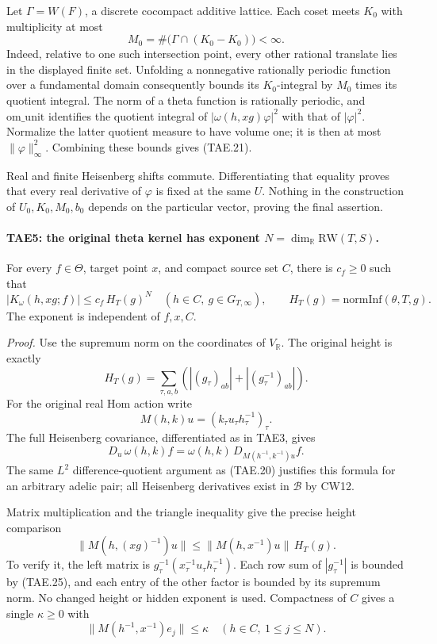 Let \(\Gamma=W(F)\), a discrete cocompact additive lattice.
Each coset meets \(K_0\) with multiplicity at most
\[
 M_0=\#\bigl(\Gamma\cap(K_0-K_0)\bigr)<\infty.
 \tag{TAE.23}
\]
Indeed, relative to one such intersection point, every other
rational translate lies in the displayed finite set.
Unfolding a nonnegative rationally periodic function over a
fundamental domain consequently bounds its \(K_0\)-integral
by \(M_0\) times its quotient integral.
The norm of a theta function is rationally periodic, and
\(\mathrm{om\_unit}\) identifies the quotient integral of
\(|\omega(h,xg)\varphi|^2\) with that of \(|\varphi|^2\).
Normalize the latter quotient measure to have volume one;
it is then at most \(\|\varphi\|_\infty^2\).
Combining these bounds gives (TAE.21).

Real and finite Heisenberg shifts commute.  Differentiating
that equality proves that every real derivative of
\(\varphi\) is fixed at the same \(U\).  Nothing in the
construction of \(U_0,K_0,M_0,b_0\) depends on the particular
vector, proving the final assertion.

\paragraph{TAE5: the original theta kernel has exponent \(N=\dim_{\mathbb R}\mathrm{RW}(T,S)\).}
\label{claim:TAE5}
For every \(f\in\Theta\), target point \(x\), and compact
source set \(C\), there is \(c_f\ge0\) such that
\[
 |K_\omega(h,xg;f)|
       \le c_f\,H_T(g)^N
       \quad(h\in C,\ g\in G_{T,\infty}),
 \qquad H_T(g)=\mathrm{normInf}(\theta,T,g).
 \tag{TAE.24}
\]
The exponent is independent of \(f,x,C\).

\emph{Proof.}
Use the supremum norm on the coordinates of \(V_{\mathbb R}\).
The original height is exactly
\[
 H_T(g)=\sum_{\tau,a,b}
       \left(|(g_\tau)_{ab}|+|(g_\tau^{-1})_{ab}|\right).
 \tag{TAE.25}
\]
For the original real Hom action write
\[
 M(h,k)u=(k_\tau u_\tau h_\tau^{-1})_\tau .
 \tag{TAE.26}
\]
The full Heisenberg covariance, differentiated as in TAE3,
gives
\[
 D_u\,\omega(h,k)f
        =\omega(h,k)\,D_{M(h^{-1},k^{-1})u}f .
 \tag{TAE.27}
\]
The same \(L^2\) difference-quotient argument as (TAE.20)
justifies this formula for an arbitrary adelic pair; all
Heisenberg derivatives exist in \(\mathcal B\) by CW12.

Matrix multiplication and the triangle inequality give the
precise height comparison
\[
 \|M(h,(xg)^{-1})u\|
       \le \|M(h,x^{-1})u\|\,H_T(g).
 \tag{TAE.28}
\]
To verify it, the left matrix is
\(g_\tau^{-1}(x_\tau^{-1}u_\tau h_\tau^{-1})\).
Each row sum of \(|g_\tau^{-1}|\) is bounded by (TAE.25),
and each entry of the other factor is bounded by its
supremum norm.  No changed height or hidden exponent is used.
Compactness of \(C\) gives a single \(\kappa\ge0\) with
\[
 \|M(h^{-1},x^{-1})e_j\|\le\kappa
                       \quad(h\in C,\ 1\le j\le N).
 \tag{TAE.29}
\]

